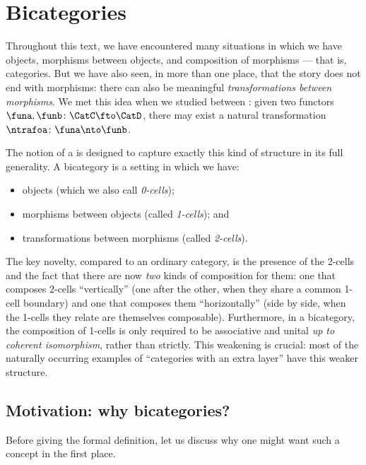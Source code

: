 
\section{Bicategories}
\label{sec:bicats-def}


Throughout this text, we have encountered many situations in which we have objects, morphisms between objects, and composition of morphisms --- that is, categories.
But we have also seen, in more than one place, that the story does not end with morphisms: there can also be meaningful \emph{transformations between morphisms}.
We met this idea when we studied  between : given two functors~$\funa, \funb \colon \CatC \fto \CatD$, there may exist a natural transformation~$\ntrafoa \colon \funa \nto \funb$.


The notion of a  is designed to capture exactly this kind of structure in its full generality.
A bicategory is a setting in which we have:
\begin{itemize}
    \item objects (which we also call \emph{0-cells});
    \item morphisms between objects (called \emph{1-cells}); and
    \item transformations between morphisms (called \emph{2-cells}).
\end{itemize}

The key novelty, compared to an ordinary category, is the presence of the 2-cells and the fact that there are now \emph{two} kinds of composition for them: one that composes 2-cells ``vertically'' (one after the other, when they share a common 1-cell boundary) and one that composes them ``horizontally'' (side by side, when the 1-cells they relate are themselves composable).
Furthermore, in a bicategory, the composition of 1-cells is only required to be associative and unital \emph{up to coherent isomorphism}, rather than strictly.
This weakening is crucial: most of the naturally occurring examples of ``categories with an extra layer'' have this weaker structure.

\subsection{Motivation: why bicategories?}

Before giving the formal definition, let us discuss why one might want such a concept in the first place.

